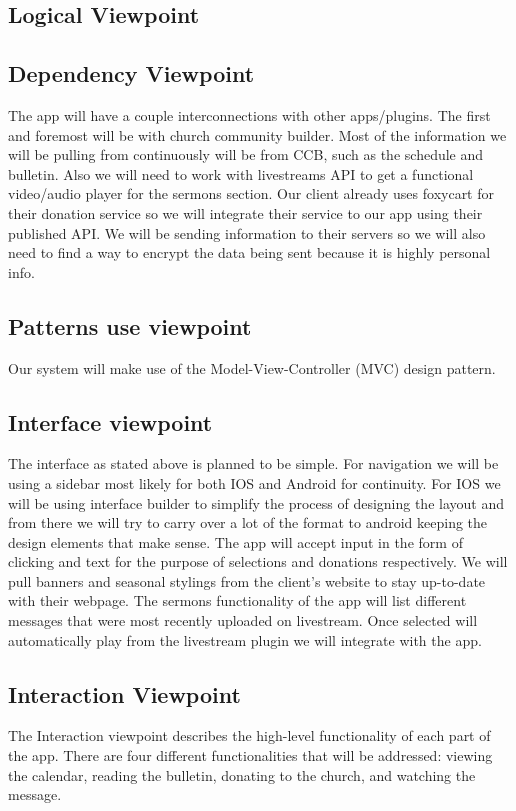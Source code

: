 \documentclass[letterpaper,10pt,draftclsnofoot,onecolumn,titlepage]{IEEEtran}
\begin{document}
		\subsection{Logical Viewpoint}

		\subsection{Dependency Viewpoint}
	The app will have a couple interconnections with other apps/plugins. 
	The first and foremost will be with church community builder. 
	Most of the information we will be pulling from continuously will be from CCB, such as the schedule and bulletin.  
	Also we will need to work with livestreams API to get a functional video/audio player for the sermons section. 
	Our client already uses foxycart for their donation service so we will integrate their service to our app using their published API. 
	We will be sending information to their servers so we will also need to find a way to encrypt the data being sent because it is highly personal info. 

		\subsection{Patterns use viewpoint}
			Our system will make use of the Model-View-Controller (MVC) design pattern.

		\subsection{Interface viewpoint}
The interface as stated above is planned to be simple. 
For navigation we will be using a sidebar most likely for both IOS and Android for continuity. 
For IOS we will be using interface builder to simplify the process of designing the layout and from there we will try to carry over a lot of the format to android keeping the design elements that make sense. 
The app will accept input in the form of clicking and text for the purpose of selections and donations respectively. 
We will pull banners and seasonal stylings from the client’s website to stay up-to-date with their webpage. 
The sermons functionality of the app will list different messages that were most recently uploaded on livestream. 
Once selected will automatically play from the livestream plugin we will integrate with the app. 


		\subsection{Interaction Viewpoint}
			The Interaction viewpoint describes the high-level functionality of each part of the app. 
			There are four different functionalities that will be addressed: viewing the calendar, reading the bulletin, donating to the church, and watching the message. 
			
\end{document}
